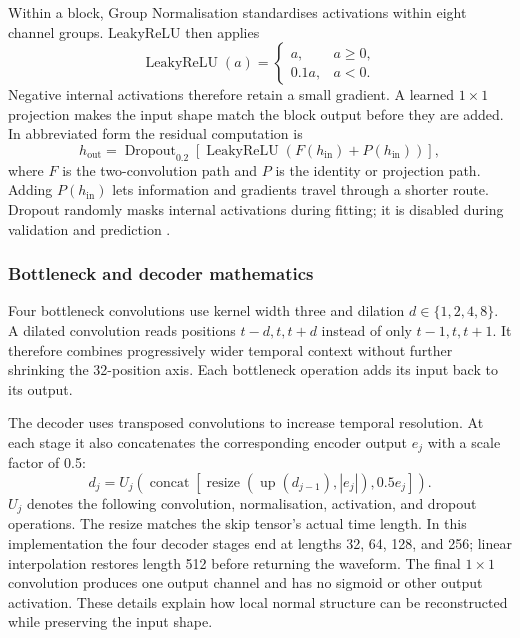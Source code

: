 Within a block, Group Normalisation standardises activations within eight
channel groups. LeakyReLU then applies
\begin{equation}
 \operatorname{LeakyReLU}(a)=\begin{cases}a,&a\geq0,\\0.1a,&a<0.\end{cases}
\end{equation}
Negative internal activations therefore retain a small gradient. A learned
$1\times1$ projection makes the input shape match the block output before
they are added. In abbreviated form the residual computation is
\begin{equation}
 h_{\mathrm{out}}=
 \operatorname{Dropout}_{0.2}\!\left[
 \operatorname{LeakyReLU}\!\left(F(h_{\mathrm{in}})+P(h_{\mathrm{in}})\right)
 \right],
 \label{eq:method-residual-block}
\end{equation}
where $F$ is the two-convolution path and $P$ is the identity or projection
path. Adding $P(h_{\mathrm{in}})$ lets information and gradients travel through
a shorter route. Dropout randomly masks internal activations during fitting;
it is disabled during validation and prediction
\cite{he2016resnet,srivastava2014dropout}.

\subsubsection{Bottleneck and decoder mathematics}

Four bottleneck convolutions use kernel width three and dilation
$d\in\{1,2,4,8\}$. A dilated convolution reads positions
$t-d,t,t+d$ instead of only $t-1,t,t+1$. It therefore combines progressively
wider temporal context without further shrinking the 32-position axis.
Each bottleneck operation adds its input back to its output.

The decoder uses transposed convolutions to increase temporal resolution.
At each stage it also concatenates the corresponding encoder output $e_j$
with a scale factor of 0.5:
\begin{equation}
 d_j=U_j\!\left(
 \operatorname{concat}\!\left[
 \operatorname{resize}(\operatorname{up}(d_{j-1}),|e_j|),
 0.5e_j\right]\right).
 \label{eq:method-decoder-skip}
\end{equation}
$U_j$ denotes the following convolution, normalisation, activation, and
dropout operations. The resize matches the skip tensor's actual time length.
In this implementation the four decoder stages end at lengths 32, 64, 128,
and 256; linear interpolation restores length 512 before returning the
waveform. The final $1\times1$ convolution produces one output channel and
has no sigmoid or other output activation. These details explain how local
normal structure can be reconstructed while preserving the input shape.

